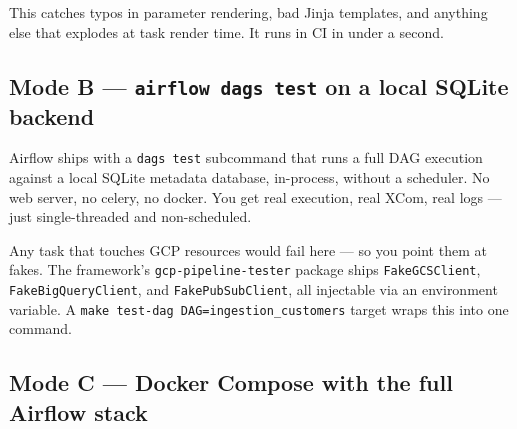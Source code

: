 \documentclass[
  11pt,
  british,
  oneside]{book}
\newenvironment{Shaded}{\begin{snugshade}}{\end{snugshade}}
\newcommand{\BuiltInTok}[1]{#1}
\newcommand{\CommentTok}[1]{\textcolor[rgb]{0.56,0.35,0.01}{\textit{#1}}}
\newcommand{\ExtensionTok}[1]{#1}
\newcommand{\KeywordTok}[1]{\textcolor[rgb]{0.13,0.29,0.53}{\textbf{#1}}}
\newcommand{\NormalTok}[1]{#1}
\newcommand{\StringTok}[1]{\textcolor[rgb]{0.31,0.60,0.02}{#1}}
\newcommand{\VariableTok}[1]{\textcolor[rgb]{0.00,0.00,0.00}{#1}}
\begin{document}
This catches typos in parameter rendering, bad Jinja templates, and
anything else that explodes at task render time. It runs in CI in under
a second.

\hypertarget{mode-b-airflow-dags-test-on-a-local-sqlite-backend}{%
\subsection{\texorpdfstring{Mode B --- \texttt{airflow\ dags\ test} on a
local SQLite
backend}{Mode B --- airflow dags test on a local SQLite backend}}\label{mode-b-airflow-dags-test-on-a-local-sqlite-backend}}

Airflow ships with a \texttt{dags\ test} subcommand that runs a full DAG
execution against a local SQLite metadata database, in-process, without
a scheduler. No web server, no celery, no docker. You get real
execution, real XCom, real logs --- just single-threaded and
non-scheduled.

\begin{Shaded}
\end{Shaded}

Any task that touches GCP resources would fail here --- so you point
them at fakes. The framework's \texttt{gcp-pipeline-tester} package
ships \texttt{FakeGCSClient}, \texttt{FakeBigQueryClient}, and
\texttt{FakePubSubClient}, all injectable via an environment variable. A
\texttt{make\ test-dag\ DAG=ingestion\_customers} target wraps this into
one command.

\hypertarget{mode-c-docker-compose-with-the-full-airflow-stack}{%
\subsection{Mode C --- Docker Compose with the full Airflow
stack}\label{mode-c-docker-compose-with-the-full-airflow-stack}}
\end{document}

